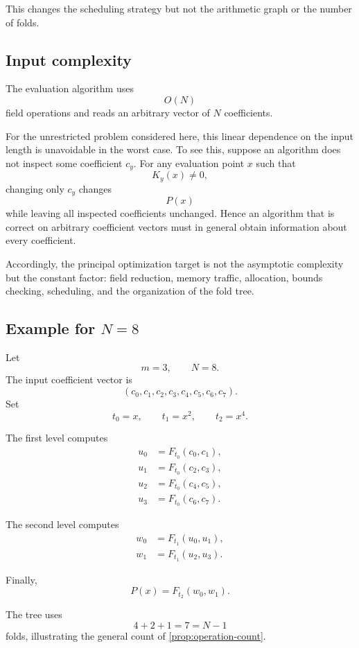 This changes the scheduling strategy but not the arithmetic graph or the
number of folds.

\subsection{Input complexity}

The evaluation algorithm uses
\[
O(N)
\]
field operations and reads an arbitrary vector of \(N\) coefficients.

For the unrestricted problem considered here, this linear dependence on
the input length is unavoidable in the worst case.  To see this, suppose
an algorithm does not inspect some coefficient \(c_y\).  For any evaluation
point \(x\) such that
\[
K_y(x)\ne0,
\]
changing only \(c_y\) changes
\[
P(x)
\]
while leaving all inspected coefficients unchanged.  Hence an algorithm
that is correct on arbitrary coefficient vectors must in general obtain
information about every coefficient.

Accordingly, the principal optimization target is not the asymptotic
complexity but the constant factor: field reduction, memory traffic,
allocation, bounds checking, scheduling, and the organization of the fold
tree.

\subsection{Example for \(N=8\)}

Let
\[
m=3,
\qquad
N=8.
\]
The input coefficient vector is
\[
(c_0,c_1,c_2,c_3,c_4,c_5,c_6,c_7).
\]
Set
\[
t_0=x,
\qquad
t_1=x^2,
\qquad
t_2=x^4.
\]

The first level computes
\[
\begin{aligned}
u_0&=F_{t_0}(c_0,c_1),\\
u_1&=F_{t_0}(c_2,c_3),\\
u_2&=F_{t_0}(c_4,c_5),\\
u_3&=F_{t_0}(c_6,c_7).
\end{aligned}
\]

The second level computes
\[
\begin{aligned}
w_0&=F_{t_1}(u_0,u_1),\\
w_1&=F_{t_1}(u_2,u_3).
\end{aligned}
\]

Finally,
\[
P(x)=F_{t_2}(w_0,w_1).
\]

The tree uses
\[
4+2+1=7=N-1
\]
folds, illustrating the general count of
\cref{prop:operation-count}.

